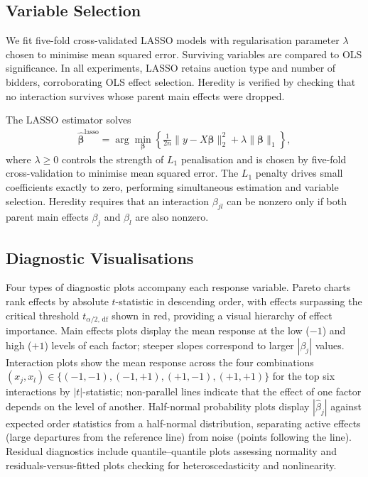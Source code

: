\subsection{Variable Selection}

We fit five-fold cross-validated LASSO models with regularisation parameter $\lambda$ chosen to minimise mean squared error. Surviving variables are compared to OLS significance. In all experiments, LASSO retains auction type and number of bidders, corroborating OLS effect selection. Heredity is verified by checking that no interaction survives whose parent main effects were dropped.

The LASSO estimator \citep{Tibshirani1996} solves
\begin{align}
  \hat{\boldsymbol{\beta}}^{\text{lasso}} = \arg\min_{\boldsymbol{\beta}} \left\{ \frac{1}{2n} \|y - X\boldsymbol{\beta}\|_2^2 + \lambda \|\boldsymbol{\beta}\|_1 \right\},
  \label{eq:lasso}
\end{align}
where $\lambda \geq 0$ controls the strength of $L_1$ penalisation and is chosen by five-fold cross-validation to minimise mean squared error. The $L_1$ penalty drives small coefficients exactly to zero, performing simultaneous estimation and variable selection. Heredity requires that an interaction $\beta_{jl}$ can be nonzero only if both parent main effects $\beta_j$ and $\beta_l$ are also nonzero.

\subsection{Diagnostic Visualisations}

Four types of diagnostic plots accompany each response variable. Pareto charts rank effects by absolute $t$-statistic in descending order, with effects surpassing the critical threshold $t_{\alpha/2,\,\text{df}}$ shown in red, providing a visual hierarchy of effect importance. Main effects plots display the mean response at the low ($-1$) and high ($+1$) levels of each factor; steeper slopes correspond to larger $|\beta_j|$ values. Interaction plots show the mean response across the four combinations $(x_j, x_l) \in \{(-1,-1), (-1,+1), (+1,-1), (+1,+1)\}$ for the top six interactions by $|t|$-statistic; non-parallel lines indicate that the effect of one factor depends on the level of another. Half-normal probability plots display $|\hat{\beta}_j|$ against expected order statistics from a half-normal distribution, separating active effects (large departures from the reference line) from noise (points following the line). Residual diagnostics include quantile--quantile plots assessing normality and residuals-versus-fitted plots checking for heteroscedasticity and nonlinearity.

